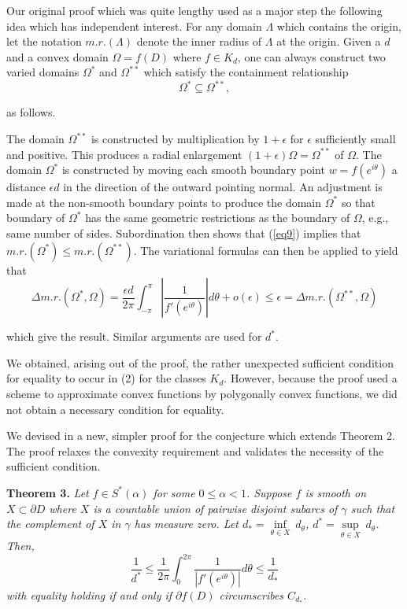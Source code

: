 \documentclass[final]{siamltex}
\begin{document}
\vspace{0.1in}

Our original proof which was quite lengthy used as a major step the following idea which has independent interest.
For any domain $\Lambda$ which contains the origin, let the notation $m.r.(\Lambda)$ denote the inner radius 
of $\Lambda$ at the origin.  Given a $d$ and a convex domain $\Omega = f(D)$ where $f \in {K}_d$, one can always construct
two varied domains $\Omega^*$ and $\Omega^{**}$ which satisfy the containment relationship
\begin{equation}
\Omega^* \subseteq \Omega^{**}, \label{eq9}
\end{equation}

\noindent as follows.

The domain $\Omega^{**}$ is constructed by multiplication by $1 + \epsilon$ for $\epsilon$ sufficiently small
and positive.  This produces a radial enlargement $(1 + \epsilon)\Omega = \Omega^{**}$ of $\Omega$.  The domain $\Omega^*$
is constructed by moving each smooth boundary point $w = f(e^{i \theta})$ a distance $\epsilon d$ in the direction of the
outward pointing normal.  An adjustment is made at the non-smooth boundary points to produce the domain $\Omega^*$ so that 
boundary of $\Omega^*$ has the same geometric restrictions as the boundary of $\Omega$, e.g., same number of sides.  Subordination
then shows that (\ref{eq9}) implies that  $m.r.(\Omega^*) \leq m.r.(\Omega^{**})$.  The variational formulas can then be applied
to yield that
$$ \Delta m.r.(\Omega^*,\Omega) = \frac{\epsilon d}{2\pi} \int_{-\pi}^{\pi} \left | \frac{1}{f'(e^{i \theta})} \right | d \theta  + o(\epsilon) \leq
\epsilon = \Delta m.r.(\Omega^{**},\Omega) $$

\noindent which give the result.  Similar arguments are used for $d^*$.

We obtained, arising out of the proof, the rather unexpected sufficient
condition for equality to occur in (2) for the classes ${K}_d$.
However, because the proof used a scheme to approximate convex
functions by polygonally convex functions, we did not obtain a
necessary condition for equality.

We devised in \cite{BarnardPearce3} a new, simpler proof for the conjecture which extends
Theorem 2.  The proof relaxes the convexity requirement and
validates the necessity of the sufficient condition.

\vspace{0.1in}

{\bf Theorem 3.} {\em Let $f\in S^*(\alpha)$ for some $0 \leq \alpha < 1$.
Suppose $f$ is smooth on $X\subset\partial D$ where $X$ is a
countable union of pairwise disjoint subarcs of $\gamma$ such
that the complement of $X$ in $\gamma$ has measure zero.  Let
$d_*={\inf\limits_{\theta\in X}} \  d_\theta$, $d^*={\sup\limits_{\theta\in X}} \  d_\theta$.  Then,
$$
\frac{1}{d^*}\leq\frac{1}{2\pi}\int^{2\pi}_0
\frac{1}{|f'(e^{i\theta})|}d\theta\leq\frac{1}{d_*}
$$
with equality holding if and only if $\partial f(D)$ circumscribes
$C_{d_*}$. }
\end{document}
